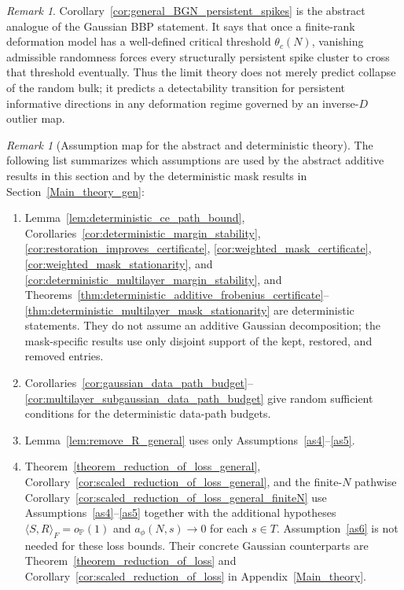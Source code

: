\documentclass[11pt]{article}
\theoremstyle{plain}
\theoremstyle{definition}
\theoremstyle{remark}
\newtheorem{rem}[thm]{Remark}
\newcommand{\PP}{\mathbb{P}}
\newcommand{\1}{\mathbf{1}}
\begin{document}
\begin{rem}
Corollary~\ref{cor:general_BGN_persistent_spikes} is the abstract analogue of the Gaussian BBP statement. It says that once a finite-rank deformation model has a well-defined critical threshold \(\theta_c(N)\), vanishing admissible randomness forces every structurally persistent spike cluster to cross that threshold eventually. Thus the limit theory does not merely predict collapse of the random bulk; it predicts a detectability transition for persistent informative directions in any deformation regime governed by an inverse-\(D\) outlier map.
\end{rem}

\begin{rem}[Assumption map for the abstract and deterministic theory]
The following list summarizes which assumptions are used by the abstract additive results in this section and by the deterministic mask results in Section~\ref{Main_theory_gen}:
\begin{enumerate}[leftmargin=2em]
\item Lemma~\ref{lem:deterministic_ce_path_bound}, Corollaries~\ref{cor:deterministic_margin_stability}, \ref{cor:restoration_improves_certificate}, \ref{cor:weighted_mask_certificate}, \ref{cor:weighted_mask_stationarity}, and \ref{cor:deterministic_multilayer_margin_stability}, and Theorems~\ref{thm:deterministic_additive_frobenius_certificate}--\ref{thm:deterministic_multilayer_mask_stationarity} are deterministic statements. They do not assume an additive Gaussian decomposition; the mask-specific results use only disjoint support of the kept, restored, and removed entries.
\item Corollaries~\ref{cor:gaussian_data_path_budget}--\ref{cor:multilayer_subgaussian_data_path_budget} give random sufficient conditions for the deterministic data-path budgets.
\item Lemma~\ref{lem:remove_R_general} uses only Assumptions~\ref{as4}--\ref{as5}.
\item Theorem~\ref{theorem_reduction_of_loss_general}, Corollary~\ref{cor:scaled_reduction_of_loss_general}, and the finite-\(N\) pathwise Corollary~\ref{cor:scaled_reduction_of_loss_general_finiteN} use Assumptions~\ref{as4}--\ref{as5} together with the additional hypotheses \(\langle S,R\rangle_F=o_{\PP}(1)\) and \(a_\phi(N,s)\to0\) for each \(s\in T\). Assumption~\ref{as6} is not needed for these loss bounds. Their concrete Gaussian counterparts are Theorem~\ref{theorem_reduction_of_loss} and Corollary~\ref{cor:scaled_reduction_of_loss} in Appendix~\ref{Main_theory}.

\end{enumerate}
\end{rem}
\end{document}
